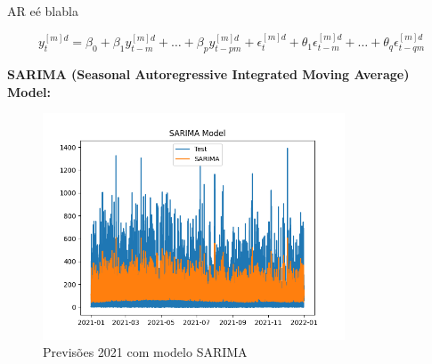 AR eé blabla

\begin{equation} \label{eq:SARIMA} y_t^{[m]d} = \beta_0 + \beta_1 y_{t-m}^{[m]d} + \dots + \beta_p y_{t-pm}^{[m]d} + \epsilon_t^{[m]d} + \theta_1 \epsilon_{t-m}^{[m]d} + \dots + \theta_q \epsilon_{t-qm}^{[m]d} \end{equation}

\textbf{SARIMA (Seasonal Autoregressive Integrated Moving Average) Model:}

\begin{figure}[H]
    \centering
    \includegraphics[width=0.8\textwidth]{../plots/SARIMA_model.png}
    \caption{Previsões 2021 com modelo SARIMA}
    \label{fig:SARIMA_model}
\end{figure}


